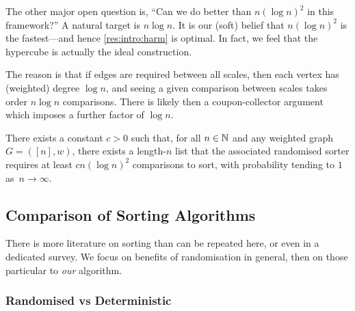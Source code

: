 \documentclass{article}
\begin{document}
The other major open question is, ``Can we do better than $n (\log n)^2$ in this framework?'' A natural target is $n \log n$.
It is our (soft) belief that $n (\log n)^2$ is the fastest---and hence \cref{res:intro:harm} is optimal.
In fact, we feel that the hypercube is actually the ideal construction.

The reason is that if edges are required between all scales, then each vertex has (weighted) degree $\log n$, and seeing a given comparison between scales takes order $n \log n$ comparisons. There is likely then a coupon-collector argument which imposes a further factor of $\log n$.

\begin{openq*}
There exists a constant $c > 0$ such that,
for all $n \in \mathbb{N}$ and any weighted graph $G = ([n], w)$,
there exists a length-$n$ list
that the associated randomised sorter requires at least $c n (\log n)^2$ comparisons to sort,
with probability tending to $1$ as~$n \to \infty$.
\end{openq*}



\subsection{Comparison of Sorting Algorithms}
\label{sec:intro:comparison}

There is more literature on sorting than can be repeated here, or even in a dedicated survey.
We focus on benefits of randomisation in general, then on those particular to \emph{our} algorithm.




\subsubsection*{Randomised vs Deterministic}
\end{document}
